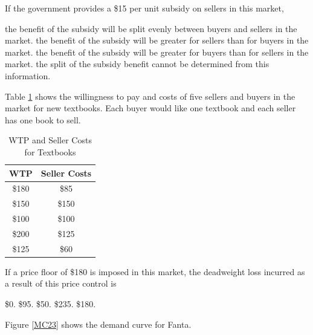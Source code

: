 \documentclass[addpoints,11pt]{exam}
\theoremstyle{definition}
\begin{document}
\begin{questions}
	If the government provides a \$15 per unit subsidy on sellers in this market, 
	
	\begin{choices}
		\choice the benefit of the subsidy will be split evenly between buyers and sellers in the market.
		\choice the benefit of the subsidy will be greater for sellers than for buyers in the market.
		\CorrectChoice the benefit of the subsidy will be greater for buyers than for sellers in the market.
	\choice the split of the subsidy benefit cannot be determined from this information. 
	\end{choices}

	
	\question Table \ref{SA2} shows the willingness to pay and costs of five sellers and buyers in the market for new textbooks. Each buyer would like one textbook and each seller has one book to sell.

\begin{table}[ht]
	\caption{WTP and Seller Costs for Textbooks}
	\centering
	\begin{tabular}{  c| c} 
		
		WTP   & Seller Costs \\
		\hline
		\$180 & \$85 \\
		\$150 & \$150 \\
		\$100 & \$100 \\
		\$200 & \$125 \\
		\$125 & \$60 \\
	\end{tabular}
	\label{SA2}
\end{table}

If a price floor of \$180 is imposed in this market, the deadweight loss incurred as a result of this price control is 

\begin{choices}
	\choice \$0.
	\choice \$95.
	\CorrectChoice \$50.
	\choice \$235.
	\choice \$180.
\end{choices}

\newpage
		
	
	\question Figure \ref{MC23} shows the demand curve for Fanta.
	

\end{questions}
\end{document}
